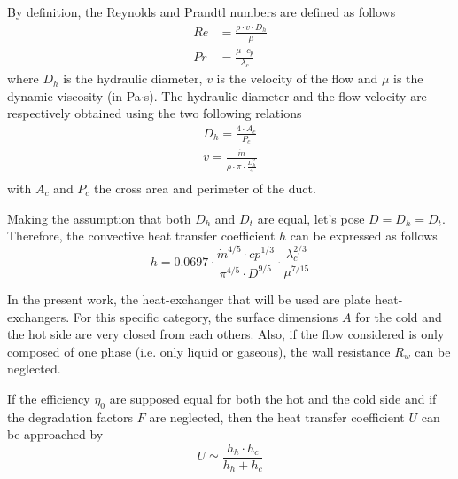 By definition, the Reynolds and Prandtl numbers are defined as follows
\begin{align}
Re &= \frac{\rho\cdot v\cdot D_h}{\mu}\label{eq:C3_Re}\\
Pr &= \frac{\mu\cdot c_p}{\lambda_c}\label{eq:C3_Pr}
\end{align}
where $D_h$ is the hydraulic diameter, $v$ is the velocity of the flow and $\mu$ is the dynamic viscosity (in Pa$\cdot$s). The hydraulic diameter and the flow velocity are respectively obtained using the two following relations
\begin{align}
D_h = \frac{4\cdot A_c}{P_c}\label{eq:C3_Dh}\\
v=\frac{\dot{m}}{\rho\cdot\pi\cdot\frac{D_h^2}{4}}\label{eq:C3_v}\\
\end{align}
with $A_c$ and $P_c$ the cross area and perimeter of the duct\citep{Ngendakumana2018}.

Making the assumption that both $D_h$ and $D_t$ are equal, let's pose $D=D_h=D_t$. Therefore, the convective heat transfer coefficient $h$ can be expressed as follows
\begin{equation}
h = 0.0697\cdot \frac{\dot{m}^{4/5}\cdot cp^{1/3}}{\pi^{4/5}\cdot D^{9/5}}\cdot \frac{\lambda_c^{2/3}}{\mu^{7/15}}
\end{equation}

In the present work, the heat-exchanger that will be used are plate heat-exchangers. For this specific category, the surface dimensions $A$ for the cold and the hot side are very closed from each others. Also, if the flow considered is only composed of one phase (i.e. only liquid or gaseous), the wall resistance $R_w$ can be neglected. 

If the efficiency $\eta_0$ are supposed equal for both the hot and the cold side and if the degradation factors $F$ are neglected, then the heat transfer coefficient $U$ can be approached by
\begin{equation}
U \simeq \frac{h_h\cdot h_c}{h_h + h_c}\label{eq:C3_AU_prop}
\end{equation}
